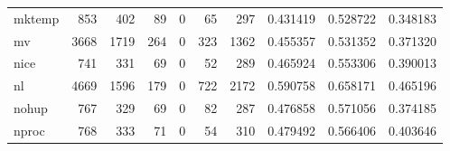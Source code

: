 \begin{tabular}{lrrrrrrrrr}
mktemp    &                                                853 &                                                402 &                                                 89 &                                                  0 &                                                 65 &                                                297 &                                           0.431419 &                               0.528722 &                             0.348183 \\
mv        &                                               3668 &                                               1719 &                                                264 &                                                  0 &                                                323 &                                               1362 &                                           0.455357 &                               0.531352 &                             0.371320 \\
nice      &                                                741 &                                                331 &                                                 69 &                                                  0 &                                                 52 &                                                289 &                                           0.465924 &                               0.553306 &                             0.390013 \\
nl        &                                               4669 &                                               1596 &                                                179 &                                                  0 &                                                722 &                                               2172 &                                           0.590758 &                               0.658171 &                             0.465196 \\
nohup     &                                                767 &                                                329 &                                                 69 &                                                  0 &                                                 82 &                                                287 &                                           0.476858 &                               0.571056 &                             0.374185 \\
nproc     &                                                768 &                                                333 &                                                 71 &                                                  0 &                                                 54 &                                                310 &                                           0.479492 &                               0.566406 &                             0.403646 \\

\end{tabular}
